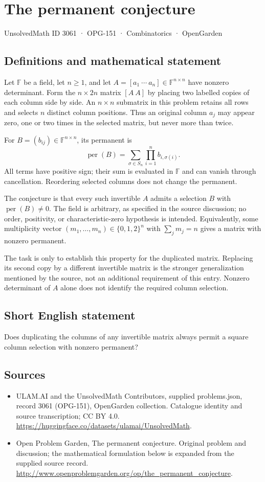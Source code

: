 \documentclass[11pt,a4paper]{article}
\begin{document}
\section*{The permanent conjecture}\label{3061}
{\small UnsolvedMath ID 3061 · OPG-151 · Combinatorics · OpenGarden}
\subsection{Definitions and mathematical statement}
Let $\mathbb F$ be a field, let $n\ge1$, and let
$A=[a_1\ \cdots\ a_n]\in\mathbb F^{n\times n}$ have nonzero determinant.
Form the $n\times2n$ matrix $[A\ A]$ by placing two labelled copies of
each column side by side. An $n\times n$ submatrix in this problem retains
all rows and selects $n$ distinct column positions. Thus an original
column $a_j$ may appear zero, one or two times in the selected matrix,
but never more than twice.

For $B=(b_{ij})\in\mathbb F^{n\times n}$, its permanent is
\[
 \operatorname{per}(B)=\sum_{\sigma\in S_n}
                         \prod_{i=1}^n b_{i,\sigma(i)}.
\]
All terms have positive sign; their sum is evaluated in $\mathbb F$ and
can vanish through cancellation. Reordering selected columns does not
change the permanent.

The conjecture is that every such invertible $A$ admits a selection $B$
with $\operatorname{per}(B)\ne0$. The field is arbitrary, as specified
in the source discussion; no order, positivity, or characteristic-zero
hypothesis is intended. Equivalently, some multiplicity vector
$(m_1,\ldots,m_n)\in\{0,1,2\}^n$ with $\sum_jm_j=n$ gives a matrix
with nonzero permanent.

The task is only to establish this property for the duplicated matrix.
Replacing its second copy by a different invertible matrix is the
stronger generalization mentioned by the source, not an additional
requirement of this entry. Nonzero determinant of $A$ alone does not
identify the required column selection.
\subsection{Short English statement}
Does duplicating the columns of any invertible matrix always permit a square column selection with nonzero permanent?
\subsection{Sources}
\begin{itemize}
\item[S1] ULAM.AI and the UnsolvedMath Contributors, supplied problems.json, record 3061 (OPG-151), OpenGarden collection. Catalogue identity and source transcription; CC BY 4.0.
\url{https://huggingface.co/datasets/ulamai/UnsolvedMath}.
\item[S2] Open Problem Garden, The permanent conjecture. Original problem and discussion; the mathematical formulation below is expanded from the supplied source record.
\url{http://www.openproblemgarden.org/op/the_permanent_conjecture}.
\end{itemize}
\end{document}
